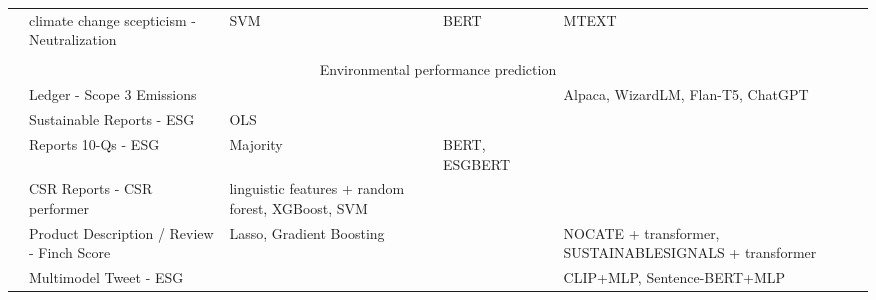 \begin{longtable}[c]{lp{3cm}p{1.5cm}p{3cm}p{1.5cm}p{3cm}}
    \citet{bhatia_automatic_2021-1} & \raggedright climate change scepticism  - Neutralization &  SVM & BERT &  & MTEXT \\
&&&&&\\
    \multicolumn{6}{c}{Environmental performance prediction} \\
    \midrule
    \citet{jain_supply_2023} & \raggedright Ledger - Scope 3 Emissions &  &   &  & Alpaca, WizardLM, Flan-T5, ChatGPT \\

    \citet{bronzini_glitter_2023} & \raggedright Sustainable Reports - ESG &  OLS &  &  &  \\

    \citet{Mehra_2022} & \raggedright Reports 10-Qs - ESG & Majority  & BERT, ESGBERT  &  &  \\

    \citet{clarkson_nlp_us_csr} & \raggedright CSR Reports - CSR performer &  linguistic features + random forest, XGBoost, SVM &  &  &  \\

    \citet{linSUSTAINABLESIGNALSijcai2023} & Product Description / Review - Finch Score &   Lasso, Gradient Boosting &  &  & NOCATE + transformer, SUSTAINABLESIGNALS + transformer  \\

    \citet{Greenscreen} & \raggedright Multimodel Tweet - ESG &  &   &  & CLIP+MLP, Sentence-BERT+MLP \\

\end{longtable}
